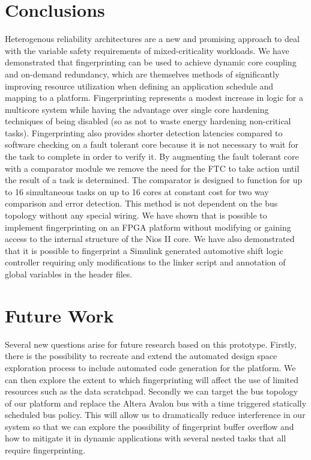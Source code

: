 \section{Conclusions}
\label{s:conclusions}

	Heterogenous reliability architectures are a new and promising approach to deal with the variable safety requirements of mixed-criticality workloads. We have demonstrated that fingerprinting can be used to achieve dynamic core coupling and on-demand redundancy, which are themselves methods of significantly improving resource utilization when defining an application schedule and mapping to a platform. Fingerprinting represents a modest increase in logic for a multicore system while having the advantage over single core hardening techniques of being disabled (so as not to waste energy hardening non-critical tasks). Fingerprinting also provides shorter detection latencies compared to software checking on a fault tolerant core because it is not necessary to wait for the task to complete in order to verify it. By augmenting the fault tolerant core with a comparator module we remove the need for the FTC to take action until the result of a task is determined. The comparator is designed to function for up to 16 simultaneous tasks on up to 16 cores at constant cost for two way comparison and error detection. This method is not dependent on the bus topology without any special wiring. We have shown that is possible to implement fingerprinting on an FPGA platform without modifying or gaining access to the internal structure of the Nios II core. We have also demonstrated that it is possible to fingerprint a Simulink generated automotive shift logic controller requiring only modifications to the linker script and annotation of global variables in the header files. 
	
\section{Future Work}
	Several new questions arise for future research based on this prototype. Firstly, there is the possibility to recreate and extend the automated design space exploration process to include automated code generation for the platform. We can then explore the extent to which fingerprinting will affect the use of limited resources such as the data scratchpad. Secondly we can target the bus topology of our platform and replace the Altera Avalon bus with a time triggered statically scheduled bus policy. This will allow us to dramatically reduce interference in our system so that we can explore the possibility of fingerprint buffer overflow and how to mitigate it in dynamic applications with several nested tasks that all require fingerprinting.
	
	